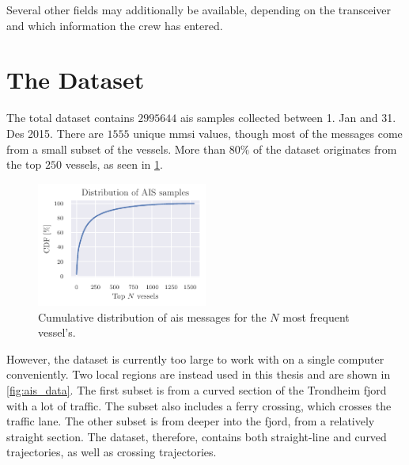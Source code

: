 Several other fields may additionally be available, depending on the transceiver and which information the crew has entered. 

\section{The Dataset}
The total dataset contains $2995644$ \acrshort{ais} samples collected between 1. Jan and 31. Des 2015. There are $1555$ unique \acrshort{mmsi} values, though most of the messages come from a small subset of the vessels. More than $80\%$ of the dataset originates from the top $250$ vessels, as seen in \cref{fig:ais_cdf}.

\begin{figure}[h]
    \centering
    \includegraphics[width=0.5\textwidth]{figures/mmsi_cdf.pdf}
    \caption{Cumulative distribution of \acrshort{ais} messages for the $N$ most frequent vessel's.}
    \label{fig:ais_cdf}
\end{figure}

However, the dataset is currently too large to work with on a single computer conveniently. Two local regions are instead used in this thesis and are shown in \cref{fig:ais_data}. The first subset is from a curved section of the Trondheim fjord with a lot of traffic. The subset also includes a ferry crossing, which crosses the traffic lane. The other subset is from deeper into the fjord, from a relatively straight section. The dataset, therefore, contains both straight-line and curved trajectories, as well as crossing trajectories. 

